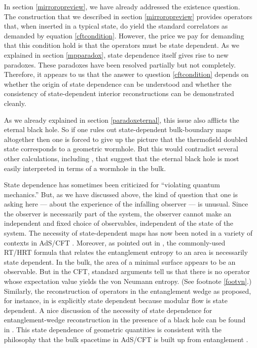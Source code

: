 \documentclass[12pt]{article}
\begin{document}
In section \ref{mirroropreview}, we have already addressed the existence question. The construction that we described in section \ref{mirroropreview} provides operators that, when inserted in a typical state, do yield the standard correlators as demanded by equation \eqref{cftcondition}. However, the price we pay for demanding that this condition hold is that the operators must be state dependent. As we explained in section \ref{mpparadox}, state dependence itself gives rise to new paradoxes. These paradoxes have been resolved partially but not completely. Therefore, it appears to us that the answer to question \eqref{cftcondition} depends on whether the origin of state dependence can be understood and whether the consistency of state-dependent interior reconstructions can be demonstrated cleanly.


As we already explained in section \ref{paradoxeternal}, this issue also afflicts the eternal black hole.
So if one rules out state-dependent bulk-boundary maps altogether then one is forced to give up the picture that the thermofield doubled state corresponds to a geometric wormhole. But this would contradict several other calculations, including \cite{Gao:2016bin}, that suggest that the eternal black hole is most easily interpreted in terms of a wormhole in the bulk.



State dependence has sometimes been criticized for ``violating quantum mechanics.'' But, as we have discussed above, the kind of question that one is asking here --- about the experience of the infalling observer --- is unusual. Since the observer is necessarily part of the system, the observer cannot make an independent and fixed choice of observables, independent of the state of the system. The necessity of state-dependent maps has now been noted in a variety of  contexts in AdS/CFT  \cite{Berenstein:2016pcx,Berenstein:2017abm,Jafferis:2014lza,Guica:2015zpf,Jafferis:2017tiu,Jefferson:2018ksk,Bzowski:2018aiq,vanBreukelen:2019zxq}.
Moreover, as pointed out in \cite{Papadodimas:2015jra}, the commonly-used RT/HRT formula that relates the entanglement entropy to an area is necessarily state dependent.  In the bulk, the area of a minimal surface appears to be an observable. But in the CFT, standard arguments tell us that there is no operator whose expectation value yields the von Neumann entropy. (See footnote \ref{footvn}.) Similarly, the reconstruction of operators in the entanglement wedge as proposed, for instance, in \cite{Faulkner:2017vdd} is explicitly state dependent because modular flow is state dependent.  A nice discussion of the necessity of state dependence for entanglement-wedge reconstruction in the presence of a black hole can be found in \cite{Hayden:2018khn}. This state dependence of geometric quantities is consistent with the philosophy that the bulk spacetime in AdS/CFT is built up from entanglement \cite{VanRaamsdonk:2010pw,VanRaamsdonk:2011zz}.
\end{document}
